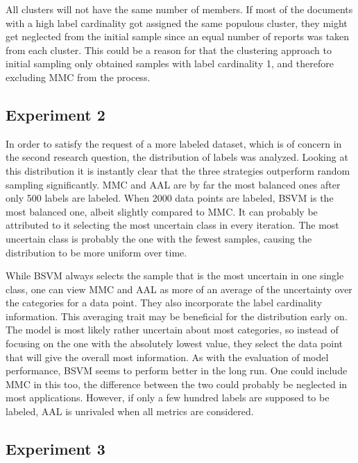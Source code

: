 All clusters will not have the same number of members.
If most of the documents with a high label cardinality got assigned the same populous cluster, they might get neglected from the initial sample since an equal number of reports was taken from each cluster.
This could be a reason for that the clustering approach to initial sampling only obtained samples with label cardinality 1, and therefore excluding MMC from the process.

\subsection{Experiment 2}

In order to satisfy the request of a more labeled dataset, which is of concern in the second research question, the distribution of labels was analyzed.
Looking at this distribution it is instantly clear that the three strategies outperform random sampling significantly.
MMC and AAL are by far the most balanced ones after only 500 labels are labeled.
When 2000 data points are labeled, BSVM is the most balanced one, albeit slightly compared to MMC.
It can probably be attributed to it selecting the most uncertain class in every iteration.
The most uncertain class is probably the one with the fewest samples, causing the distribution to be more uniform over time.

While BSVM always selects the sample that is the most uncertain in one single class, one can view MMC and AAL as more of an average of the uncertainty over the categories for a data point.
They also incorporate the label cardinality information.
This averaging trait may be beneficial for the distribution early on.
The model is most likely rather uncertain about most categories, so instead of focusing on the one with the absolutely lowest value, they select the data point that will give the overall most information.
As with the evaluation of model performance, BSVM seems to perform better in the long run.
One could include MMC in this too, the difference between the two could probably be neglected in most applications.
However, if only a few hundred labels are supposed to be labeled, AAL is unrivaled when all metrics are considered.

\subsection{Experiment 3}

